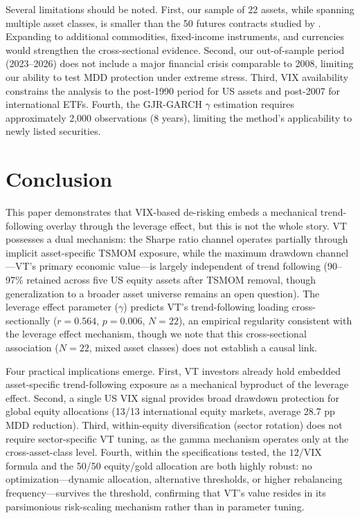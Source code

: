 \documentclass[12pt,a4paper]{article}
\begin{document}
Several limitations should be noted. First, our sample of 22 assets, while spanning multiple asset classes, is smaller than the 50 futures contracts studied by \citet{hood2025}. Expanding to additional commodities, fixed-income instruments, and currencies would strengthen the cross-sectional evidence. Second, our out-of-sample period (2023--2026) does not include a major financial crisis comparable to 2008, limiting our ability to test MDD protection under extreme stress. Third, VIX availability constrains the analysis to the post-1990 period for US assets and post-2007 for international ETFs. Fourth, the GJR-GARCH $\gamma$ estimation requires approximately 2,000 observations (8 years), limiting the method's applicability to newly listed securities.


\section{Conclusion}

This paper demonstrates that VIX-based de-risking embeds a mechanical trend-following overlay through the leverage effect, but this is not the whole story. VT possesses a dual mechanism: the Sharpe ratio channel operates partially through implicit asset-specific TSMOM exposure, while the maximum drawdown channel---VT's primary economic value---is largely independent of trend following (90--97\% retained across five US equity assets after TSMOM removal, though generalization to a broader asset universe remains an open question). The leverage effect parameter ($\gamma$) predicts VT's trend-following loading cross-sectionally ($r = 0.564$, $p = 0.006$, $N = 22$), an empirical regularity consistent with the leverage effect mechanism, though we note that this cross-sectional association ($N = 22$, mixed asset classes) does not establish a causal link.

Four practical implications emerge. First, VT investors already hold embedded asset-specific trend-following exposure as a mechanical byproduct of the leverage effect. Second, a single US VIX signal provides broad drawdown protection for global equity allocations (13/13 international equity markets, average 28.7 pp MDD reduction). Third, within-equity diversification (sector rotation) does not require sector-specific VT tuning, as the gamma mechanism operates only at the cross-asset-class level. Fourth, within the specifications tested, the $12/\text{VIX}$ formula and the 50/50 equity/gold allocation are both highly robust: no optimization---dynamic allocation, alternative thresholds, or higher rebalancing frequency---survives the \citet{harvey2016} threshold, confirming that VT's value resides in its parsimonious risk-scaling mechanism rather than in parameter tuning.
\end{document}
